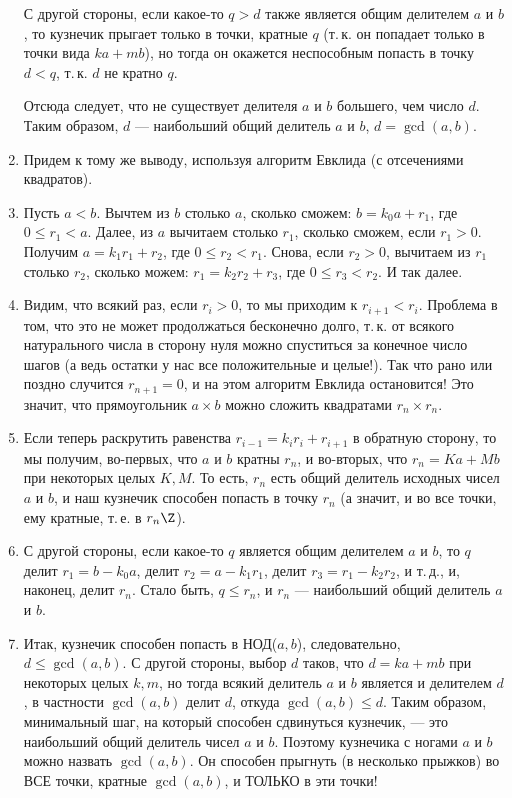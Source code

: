 \begin{enumerate}
С другой стороны, если какое-то $q>d$ также является общим делителем $a$ и $b$, то кузнечик прыгает только в точки, кратные $q$ (т.\,к. он попадает только в точки вида $ka+mb$), но тогда он окажется неспособным попасть в точку $d<q$, т.\,к. $d$ не кратно $q$.

Отсюда следует, что не существует делителя $a$ и $b$ большего, чем число $d$. Таким образом, $d$ --- наибольший общий делитель $a$ и $b$, $d=\gcd(a,b)$.


\item Придем к тому же выводу, используя алгоритм Евклида (с отсечениями квадратов).
\item Пусть $a<b$. Вычтем из $b$ столько $a$, сколько сможем: $b=k_0a+r_1$, где $0\le r_1<a$. Далее, из $a$ вычитаем столько $r_1$, сколько сможем, если $r_1>0$. Получим $a=k_1r_1+r_2$, где $0\le r_2<r_1$. Снова, если $r_2>0$, вычитаем из $r_1$ столько $r_2$, сколько можем: $r_1=k_2r_2+r_3$, где $0\le r_3<r_2$. И так далее.
\item Видим, что всякий раз, если $r_i>0$, то мы приходим к $r_{i+1}<r_i$. Проблема в том, что это не может продолжаться бесконечно долго, т.\,к. от всякого натурального числа в сторону нуля можно спуститься за конечное число шагов (а ведь остатки у нас все положительные и целые!). Так что рано или поздно случится $r_{n+1}=0$, и на этом алгоритм Евклида остановится! Это значит, что прямоугольник $a\times b$ можно сложить квадратами $r_n\times r_n$.
\item Если теперь раскрутить равенства $r_{i-1}=k_ir_i+r_{i+1}$ в обратную сторону, то мы получим, во-первых, что $a$ и $b$ кратны $r_n$, и во-вторых, что $r_n=Ka+Mb$ при некоторых целых $K,M$. То есть, $r_n$ есть общий делитель исходных чисел $a$ и $b$, и наш кузнечик способен попасть в точку $r_n$ (а значит, и во все точки, ему кратные, т.\,е. в $r_n\Z$).
\item С другой стороны, если какое-то $q$ является общим делителем $a$ и $b$, то $q$ делит $r_1=b-k_0a$, делит $r_2=a-k_1r_1$, делит $r_3=r_1-k_2r_2$, и т.\,д., и, наконец, делит $r_n$. Стало быть, $q\le r_n$, и $r_n$ --- наибольший общий делитель $a$ и $b$.
\item Итак, кузнечик способен попасть в НОД($a,b$), следовательно, $d\le\gcd(a,b)$. С другой стороны, выбор $d$ таков, что $d=ka+mb$ при некоторых целых $k,m$, но тогда всякий делитель $a$ и $b$ является и делителем $d$, в частности $\gcd(a,b)$ делит $d$, откуда $\gcd(a,b)\le d$. Таким образом, минимальный шаг, на который способен сдвинуться кузнечик, --- это наибольший общий делитель чисел $a$ и $b$. Поэтому кузнечика с ногами $a$ и $b$ можно назвать $\gcd(a,b)$. Он способен прыгнуть (в несколько прыжков) во ВСЕ точки, кратные $\gcd(a,b)$, и ТОЛЬКО в эти точки!
\end{enumerate}


